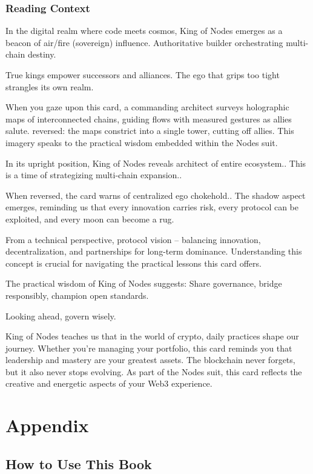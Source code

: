 \documentclass[11pt,oneside]{book}
\begin{document}
\begin{minipage}[t]{0.55\textwidth}
  \subsection*{Reading Context}
  In the digital realm where code meets cosmos, King of Nodes emerges as a beacon of air/fire (sovereign) influence. Authoritative builder orchestrating multi-chain destiny.

  True kings empower successors and alliances. The ego that grips too tight strangles its own realm.

  When you gaze upon this card, a commanding architect surveys holographic maps of interconnected chains, guiding flows with measured gestures as allies salute. reversed: the maps constrict into a single tower, cutting off allies. This imagery speaks to the practical wisdom embedded within the Nodes suit.

  In its upright position, King of Nodes reveals architect of entire ecosystem.. This is a time of strategizing multi-chain expansion..

  When reversed, the card warns of centralized ego chokehold.. The shadow aspect emerges, reminding us that every innovation carries risk, every protocol can be exploited, and every moon can become a rug.

  From a technical perspective, protocol vision – balancing innovation, decentralization, and partnerships for long-term dominance. Understanding this concept is crucial for navigating the practical lessons this card offers.

  The practical wisdom of King of Nodes suggests: Share governance, bridge responsibly, champion open standards.

  Looking ahead, govern wisely.

  King of Nodes teaches us that in the world of crypto, daily practices shape our journey. Whether you're managing your portfolio, this card reminds you that leadership and mastery are your greatest assets. The blockchain never forgets, but it also never stops evolving. As part of the Nodes suit, this card reflects the creative and energetic aspects of your Web3 experience.

\end{minipage}

\chapter*{Appendix}

\section*{How to Use This Book}
\end{document}
